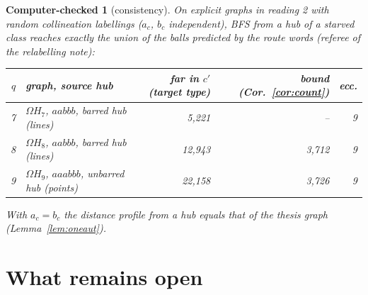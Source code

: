 \documentclass[11pt]{amsart}
\theoremstyle{plain}
\newtheorem{computer}{Computer-checked}
\theoremstyle{definition}
\theoremstyle{remark}
\newcommand{\Om}{\Omega}
\begin{document}
\begin{computer}[consistency]\label{cc:consistency}
On explicit graphs in reading 2 with random collineation labellings ($a_c$, $b_c$ independent), BFS from a hub of a
starved class reaches exactly the union of the balls predicted by the route words (referee of the relabelling note):
\begin{center}\small
\begin{tabular}{@{}rlrrr@{}}
\toprule
$q$ & graph, source hub & far in $c'$ (target type) & bound (Cor.~\ref{cor:count}) & ecc.\\
\midrule
7 & $\Om H_7$, $aabbb$, barred hub (lines) & 5,221 & -- & 9\\
8 & $\Om H_8$, $aabbb$, barred hub (lines) & 12,943 & 3,712 & 9\\
9 & $\Om H_9$, $aaabbb$, unbarred hub (points) & 22,158 & 3,726 & 9\\
\bottomrule
\end{tabular}
\end{center}
With $a_c = b_c$ the distance profile from a hub equals that of the thesis graph (Lemma~\ref{lem:oneaut}).
\end{computer}

\section{What remains open}\label{sec:open}
\end{document}

